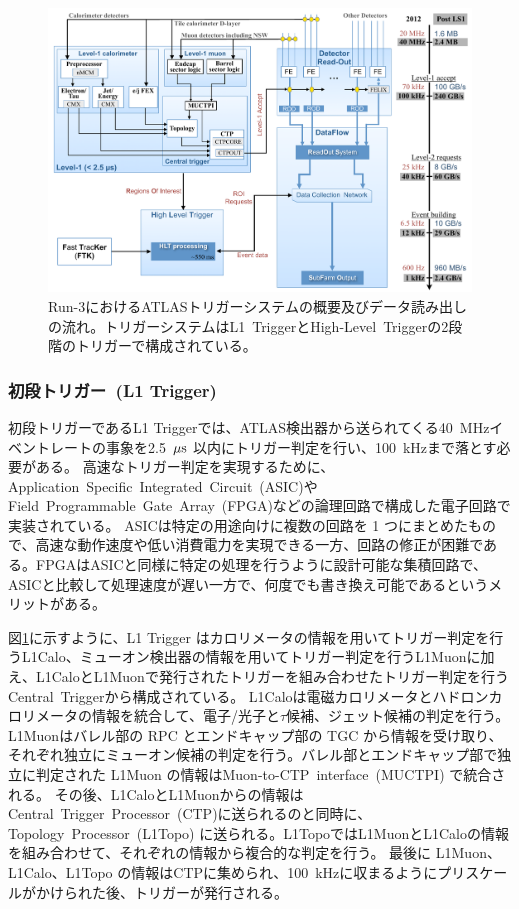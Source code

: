 \begin{figure}[tb]
  \centering
  \includegraphics[clip, width=14cm]{fig/3/trigger-nagare2.pdf}
  \caption{Run-3におけるATLASトリガーシステムの概要及びデータ読み出しの流れ\cite{article:Run3trigger}。トリガーシステムはL1~TriggerとHigh-Level~Triggerの2段階のトリガーで構成されている。}
  \label{fig:トリガーの全体像}
\end{figure}

\subsubsection{初段トリガー~(L1 Trigger)}\label{L1Topo}
初段トリガーであるL1 Triggerでは、ATLAS検出器から送られてくる40~MHzイベントレートの事象を2.5~$\rm{\mu s}$ 以内にトリガー判定を行い、100~kHzまで落とす必要がある。
高速なトリガー判定を実現するために、Application~Specific~Integrated~Circuit~(ASIC)やField~Programmable~Gate~Array~(FPGA)などの論理回路で構成した電子回路で実装されている。
ASICは特定の用途向けに複数の回路を 1 つにまとめたもので、高速な動作速度や低い消費電力を実現できる一方、回路の修正が困難である。FPGAはASICと同様に特定の処理を行うように設計可能な集積回路で、ASICと比較して処理速度が遅い一方で、何度でも書き換え可能であるというメリットがある。

図\ref{fig:トリガーの全体像}に示すように、L1 Trigger はカロリメータの情報を用いてトリガー判定を行うL1Calo、ミューオン検出器の情報を用いてトリガー判定を行うL1Muonに加え、L1CaloとL1Muonで発行されたトリガーを組み合わせたトリガー判定を行うCentral~Triggerから構成されている。
L1Caloは電磁カロリメータとハドロンカロリメータの情報を統合して、電子/光子と$\tau$候補、ジェット候補の判定を行う。
L1Muonはバレル部の RPC とエンドキャップ部の TGC から情報を受け取り、それぞれ独立にミューオン候補の判定を行う。バレル部とエンドキャップ部で独立に判定された L1Muon の情報はMuon-to-CTP~interface~(MUCTPI) で統合される。
その後、L1CaloとL1Muonからの情報はCentral~Trigger~Processor~(CTP)に送られるのと同時に、Topology~Processor~(L1Topo) に送られる。L1TopoではL1MuonとL1Caloの情報を組み合わせて、それぞれの情報から複合的な判定を行う。
最後に L1Muon、L1Calo、L1Topo の情報はCTPに集められ、100~kHzに収まるようにプリスケールがかけられた後、トリガーが発行される。


